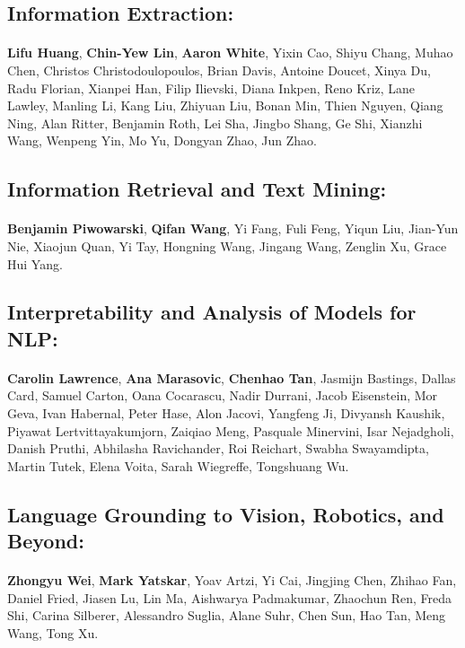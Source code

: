 \subsection*{Information Extraction:}
\paragraph{}\textbf{Lifu Huang}, \textbf{Chin-Yew Lin}, \textbf{Aaron White}, Yixin Cao, Shiyu Chang, Muhao Chen, Christos Christodoulopoulos, Brian Davis, Antoine Doucet, Xinya Du, Radu Florian, Xianpei Han, Filip Ilievski, Diana Inkpen, Reno Kriz, Lane Lawley, Manling Li, Kang Liu, Zhiyuan Liu, Bonan Min, Thien Nguyen, Qiang Ning, Alan Ritter, Benjamin Roth, Lei Sha, Jingbo Shang, Ge Shi, Xianzhi Wang, Wenpeng Yin, Mo Yu, Dongyan Zhao, Jun Zhao.
\subsection*{Information Retrieval and Text Mining:}
\paragraph{}\textbf{Benjamin Piwowarski}, \textbf{Qifan Wang}, Yi Fang, Fuli Feng, Yiqun Liu, Jian-Yun Nie, Xiaojun Quan, Yi Tay, Hongning Wang, Jingang Wang, Zenglin Xu, Grace Hui Yang.
\subsection*{Interpretability and Analysis of Models for NLP:}
\paragraph{}\textbf{Carolin Lawrence}, \textbf{Ana Marasovic}, \textbf{Chenhao Tan}, Jasmijn Bastings, Dallas Card, Samuel Carton, Oana Cocarascu, Nadir Durrani, Jacob Eisenstein, Mor Geva, Ivan Habernal, Peter Hase, Alon Jacovi, Yangfeng Ji, Divyansh Kaushik, Piyawat Lertvittayakumjorn, Zaiqiao Meng, Pasquale Minervini, Isar Nejadgholi, Danish Pruthi, Abhilasha Ravichander, Roi Reichart, Swabha Swayamdipta, Martin Tutek, Elena Voita, Sarah Wiegreffe, Tongshuang Wu.
\subsection*{Language Grounding to Vision, Robotics, and Beyond:}
\paragraph{}\textbf{Zhongyu Wei}, \textbf{Mark Yatskar}, Yoav Artzi, Yi Cai, Jingjing Chen, Zhihao Fan, Daniel Fried, Jiasen Lu, Lin Ma, Aishwarya Padmakumar, Zhaochun Ren, Freda Shi, Carina Silberer, Alessandro Suglia, Alane Suhr, Chen Sun, Hao Tan, Meng Wang, Tong Xu.
